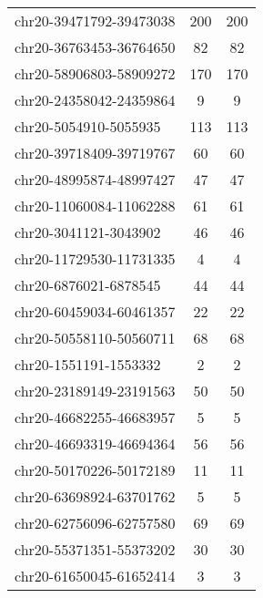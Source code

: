 \begin{longtable}{lSS}
	chr20-39471792-39473038 & 200    & 200                                       \\
	chr20-36763453-36764650 & 82     & 82                                        \\
	chr20-58906803-58909272 & 170    & 170                                       \\
	chr20-24358042-24359864 & 9      & 9                                         \\
	chr20-5054910-5055935   & 113    & 113                                       \\
	chr20-39718409-39719767 & 60     & 60                                        \\
	chr20-48995874-48997427 & 47     & 47                                        \\
	chr20-11060084-11062288 & 61     & 61                                        \\
	chr20-3041121-3043902   & 46     & 46                                        \\
	chr20-11729530-11731335 & 4      & 4                                         \\
	chr20-6876021-6878545   & 44     & 44                                        \\
	chr20-60459034-60461357 & 22     & 22                                        \\
	chr20-50558110-50560711 & 68     & 68                                        \\
	chr20-1551191-1553332   & 2      & 2                                         \\
	chr20-23189149-23191563 & 50     & 50                                        \\
	chr20-46682255-46683957 & 5      & 5                                         \\
	chr20-46693319-46694364 & 56     & 56                                        \\
	chr20-50170226-50172189 & 11     & 11                                        \\
	chr20-63698924-63701762 & 5      & 5                                         \\
	chr20-62756096-62757580 & 69     & 69                                        \\
	chr20-55371351-55373202 & 30     & 30                                        \\
	chr20-61650045-61652414 & 3      & 3                                         \\

\end{longtable}
